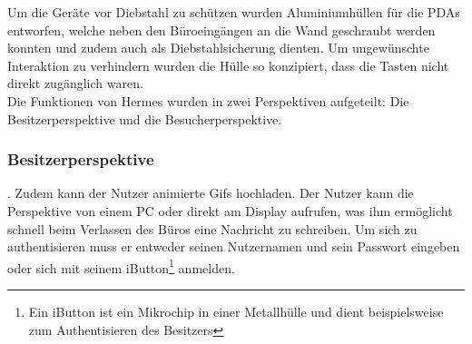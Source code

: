 Um die Geräte vor Diebstahl zu schützen wurden Aluminiumhüllen für die PDAs entworfen, welche neben den Büroeingängen an die Wand geschraubt werden konnten und zudem auch als Diebstahlsicherung dienten. Um ungewünschte Interaktion zu verhindern wurden die Hülle so konzipiert, dass die Tasten nicht direkt zugänglich waren.\\

Die Funktionen von Hermes wurden in zwei Perspektiven aufgeteilt: Die Besitzerperspektive und die Besucherperspektive.
\subsubsection{Besitzerperspektive}
\cite{cheverest:2003:paper}. Zudem kann der Nutzer animierte Gifs hochladen.
Der Nutzer kann die Perspektive von einem PC oder direkt am Display aufrufen, was ihm ermöglicht schnell beim Verlassen des Büros eine Nachricht zu schreiben. Um sich zu authentisieren muss er entweder seinen Nutzernamen und sein Passwort eingeben oder sich mit seinem iButton\footnote{Ein iButton ist ein Mikrochip in einer Metallhülle und dient beispielsweise zum Authentisieren des Besitzers\cite{iButton:website}} anmelden.
